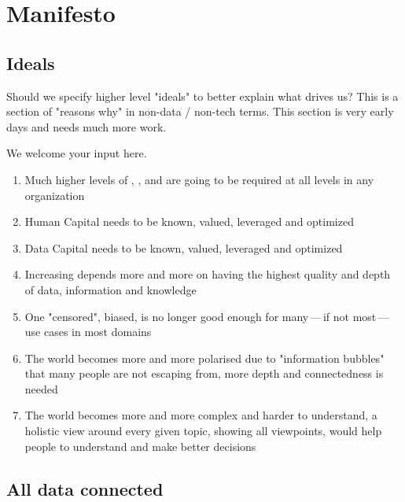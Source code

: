 \chapter{Manifesto}\label{ch:ekg-manifesto}


\section{Ideals}

Should we specify higher level "ideals" to better explain what drives us?
This is a section of "reasons why" in non-data / non-tech terms.
This section is very early days and needs much more work.

We welcome your input here.

\begin{enumerate}
    \item Much higher levels of , ,  and
           are going to be required at all levels in any organization
    \item Human Capital needs to be known, valued, leveraged and optimized
    \item Data Capital needs to be known, valued, leveraged and optimized
    \item Increasing  depends more and more on having the highest quality and depth of data,
          information and knowledge
    \item One "censored", biased,  is no longer good enough for many\,---\,if not
          most\,---\,use cases in most domains
    \item The world becomes more and more polarised due to "information bubbles" that many people are not escaping
          from, more depth and connectedness is needed
    \item The world becomes more and more complex and harder to understand, a holistic view around every given topic,
          showing all viewpoints, would help people to understand and make better decisions
\end{enumerate}

\section{All data connected}

